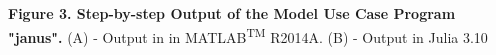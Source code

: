 \textbf{Figure 3. Step-by-step Output of the Model Use Case Program "janus".} (A) - Output in  in MATLAB\textsuperscript{TM} R2014A. (B) - Output in Julia 3.10
  
  